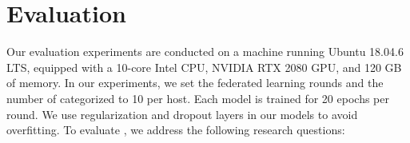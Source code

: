  \section{Evaluation}
 \label{sec:eval}
















Our evaluation experiments are conducted on a machine running Ubuntu 18.04.6 LTS, equipped with a 10-core Intel CPU, NVIDIA RTX 2080 GPU, and 120 GB of memory. In our experiments, we set the federated learning rounds and the number of categorized \gnnshort to 10 per host. Each model is trained for 20 epochs per round. We use regularization and dropout layers in our models to avoid overfitting. To evaluate \Sys, we address the following research questions: %

